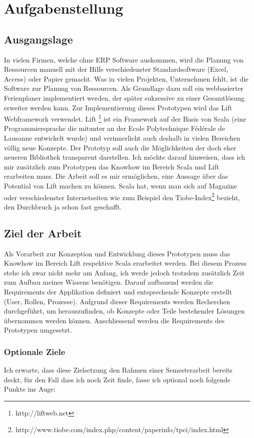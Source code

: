 \chapter{Aufgabenstellung}\label{aufgabenstellung}
\section{Ausgangslage}
In vielen Firmen, welche ohne ERP Software auskommen, wird die Planung von Ressourcen manuell mit der Hilfe verschiedenster Standardsoftware (Excel, Access) oder Papier gemacht. Was in vielen Projekten, Unternehmen fehlt, ist die Software zur Planung von Ressourcen. Als Grundlage dazu soll ein webbasierter Ferienplaner implementiert werden, der sp\"ater sukzessive zu einer Gesamtl\"osung erweiter werden kann. Zur Implementierung dieses Prototypen wird das Lift Webframework verwendet. Lift \footnote{http://liftweb.net} ist ein Framework auf der Basis von Scala (eine Programmiersprache die mitunter an der Ecole Polytechnique Fédérale de Lausanne entwickelt wurde) und verinnerlicht auch deshalb in vielen Bereichen v\"ollig neue Konzepte. Der Prototyp soll auch die M\"oglichkeiten der doch eher neueren Bibliothek transparent darstellen. Ich m\"ochte darauf hinweisen, dass ich mir zus\"atzlich zum Prototypen das Knowhow im Bereich Scala und Lift erarbeiten muss. Die Arbeit soll es mir erm\"oglichen, eine Aussage \"uber das Potential von Lift machen zu k\"onnen. Scala hat, wenn man sich auf Magazine oder verschiedenster Internetseiten wie zum Beispiel den Tiobe-Index\footnote{http://www.tiobe.com/index.php/content/paperinfo/tpci/index.html} bezieht, den Durchbruch ja schon fast geschafft. 

\section{Ziel der Arbeit}
Als Vorarbeit zur Konzeption und Entwicklung dieses Prototypen muss das Knowhow im Bereich Lift respektive Scala erarbeitet werden. Bei diesem Prozess stehe ich zwar nicht mehr am Anfang, ich werde jedoch trotzdem zus\"atzlich Zeit zum Aufbau meines Wissens ben\"otigen. Darauf aufbauend werden die Requirements der Applikation definiert und entsprechende Konzepte erstellt (User, Rollen, Prozesse). Aufgrund dieser Requirements werden Recherchen durchgef\"uhrt, um herauszufinden, ob Konzepte oder Teile bestehender L\"osungen \"ubernommen werden k\"onnen. Anschliessend werden die Requirements des Prototypen umgesetzt. 

\subsection{Optionale Ziele}
Ich erwarte, dass diese Zielsetzung den Rahmen einer Semesterarbeit bereits deckt, f\"ur den Fall dass ich noch Zeit finde, fasse ich optional noch folgende Punkte ins Auge: 

